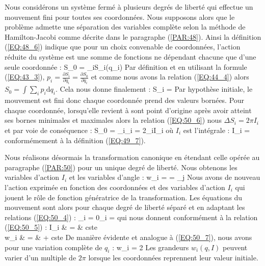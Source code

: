 Nous consid\'{e}rons un syst\`{e}me ferm\'{e} \`{a} plusieurs degr\'{e}s de libert\'{e} qui effectue un mouvement fini pour toutes ses coordonn\'{e}es. Nous supposons alors que le probl\`{e}me admette une s\'{e}paration des variables compl\`{e}te selon la m\'{e}thode de Hamilton-Jacobi comme d\'{e}crite dans le paragraphe (\ref{PAR:48}). Ainsi la d\'{e}finition (\ref{EQ:48_6}) indique que pour un choix convenable de coordonn\'{e}es, l'action r\'{e}duite du syst\`{e}me est une somme de fonctions ne d\'{e}pendant chacune que d'une seule coordonn\'{e}e :
\be
	S_{0} = \sum_{i}S_{i}(q_{i}) \label{EQ:52_1}
\ee
Par d\'{e}finition et en utilisant la formule (\ref{EQ:43_3}), $p_{i} = \frac{\partial S_{i}}{\partial q_{i}} = \frac{\partial S_{0}}{\partial q_{i}}$ et comme nous avons la relation (\ref{EQ:44_4}) alors $S_{0} = \int{\sum_{i}p_{i}\mathrm{d}q_{i}}$. Cela nous donne finalement :
\be
	S_{i} =  \label{EQ:52_2}
\ee
Par hypoth\`{e}se initiale, le mouvement est fini donc chaque coordonn\'{e}e prend des valeurs born\'{e}es. Pour chaque coordonn\'{e}e, lorsqu'elle revient \`{a} sont point d'origine apr\`{e}s avoir atteint ses bornes minimales et maximales alors la relation (\ref{EQ:50_6}) nous $\Delta S_{i} = 2\pi I_{i}$ et par voie de cons\'{e}quence :
\be
	\Delta S_{0} = \sum_{i}\Delta_{i} = 2\pi\sum_{i}I_{i} \label{EQ:52_3}
\ee
o\`{u} $I_{i}$ est l'int\'{e}grale :
\be
	I_{i} =  \label{EQ:52_4}
\ee
conform\'{e}mement \`{a} la d\'{e}finition (\ref{EQ:49_7}).

Nous r\'{e}alisons d\'{e}sormais la transformation canonique en \'{e}tendant celle op\'{e}r\'{e}e au paragraphe (\ref{PAR:50}) pour un unique degr\'{e} de libert\'{e}. Nous obtenons les variables d'action $I_{i}$ et les variables d'angle :
\be
	w_{i} =  = \sum_{j} \label{EQ:52_5}
\ee
Nous avons de nouveau l'action exprim\'{e}e en fonction des coordonn\'{e}es et des variables d'action $I_{i}$ qui jouent le r\^{o}le de fonction g\'{e}n\'{e}ratrice de la transformation. Les \'{e}quations du mouvement sont alors pour chaque degr\'{e} de libert\'{e} s\'{e}par\'{e} et en adaptant les relations (\ref{EQ:50_4}) :
\be
	_{i} = 0_{i} =  \label{EQ:52_6}
\ee
qui nous donnent conform\'{e}ment \`{a} la relation (\ref{EQ:50_5}) :
\bea
	I_{i} & = & cste \nonumber \\
	w_{i} & = &  + cste \label{EQ:52_7}
\eea
De mani\`{e}re \'{e}vidente et analogue \`{a} (\ref{EQ:50_7}), nous avons pour une variation compl\`{e}te de $q_{i}$ :
\be
	\Delta w_{i} = 2\pi \label{EQ:52_8}
\ee
Les grandeurs $w_{i}(q,I)$ peuvent varier d'un multiple de $2\pi$ lorsque les coordonn\'{e}es reprennent leur valeur initiale.

